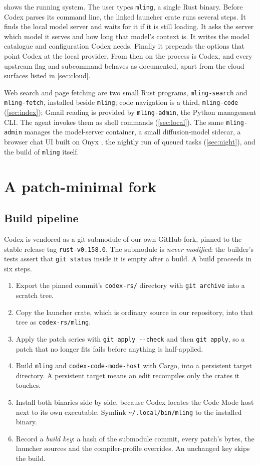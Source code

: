 \documentclass[11pt]{article}
\newcommand{\code}[1]{\texttt{#1}}
\begin{document}
 shows the running system. The user types \code{mling}, a single Rust binary.
Before Codex parses its command line, the linked launcher crate runs several steps. It finds the
local model server and waits for it if it is still loading. It asks the server which model it serves
and how long that model's context is. It writes the model catalogue and configuration Codex needs.
Finally it prepends the options that point Codex at the local provider. From then on the process is
Codex, and every upstream flag and subcommand behaves as documented, apart from the cloud surfaces
listed in \cref{sec:cloud}.

Web search and page fetching are two small Rust programs, \code{mling-search} and
\code{mling-fetch}, installed beside \code{mling}; code navigation is a third,
\code{mling-code} (\cref{sec:index}); Gmail reading is provided by
\code{mling-admin}, the Python management CLI. The agent invokes them as shell commands
(\cref{sec:local}). The same \code{mling-admin} manages the model-server container, a small
diffusion-model sidecar, a browser chat UI built on Onyx \cite{onyx}, the nightly run of queued
tasks (\cref{sec:night}), and the build of \code{mling} itself.

\section{A patch-minimal fork}
\label{sec:fork}

\subsection{Build pipeline}

Codex is vendored as a git submodule of our own GitHub fork, pinned to the stable release tag
\code{rust-v0.158.0}. The submodule is \emph{never modified}: the builder's tests assert that
\code{git status} inside it is empty after a build. A build proceeds in six steps.
\begin{enumerate}
  \item Export the pinned commit's \code{codex-rs/} directory with \code{git archive} into a scratch
    tree.
  \item Copy the launcher crate, which is ordinary source in our repository, into that tree as
    \code{codex-rs/mling}.
  \item Apply the patch series with \code{git apply -{}-check} and then \code{git apply}, so a patch
    that no longer fits fails before anything is half-applied.
  \item Build \code{mling} and \code{codex-code-mode-host} with Cargo, into a persistent target
    directory. A persistent target means an edit recompiles only the crates it touches.
  \item Install both binaries side by side, because Codex locates the Code Mode host next to its own
    executable. Symlink \code{\textasciitilde/.local/bin/mling} to the installed binary.
  \item Record a \emph{build key}: a hash of the submodule commit, every patch's bytes, the launcher
    sources and the compiler-profile overrides. An unchanged key skips the build.
\end{enumerate}
\end{document}
